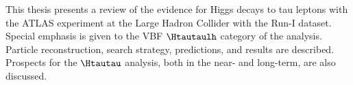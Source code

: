 
This thesis presents a review of the evidence for Higgs decays to tau leptons with the ATLAS experiment at the Large Hadron Collider with the Run-I dataset. Special emphasis is given to the VBF $\Htautaulh$ category of the analysis. Particle reconstruction, search strategy, predictions, and results are described. Prospects for the $\Htautau$ analysis, both in the near- and long-term, are also discussed.


